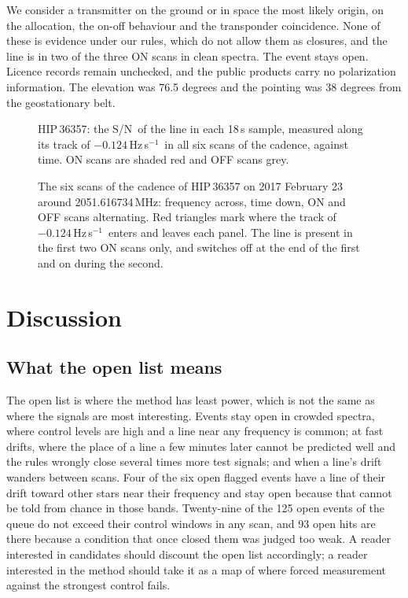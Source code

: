 \documentclass[twocolumn]{aastex631}
\newcommand{\hzs}{Hz\,s$^{-1}$}
\newcommand{\sn}{S/N}
\begin{document}
We consider a transmitter on the ground or in space the most likely origin,
on the allocation, the on-off behaviour and the transponder coincidence.
None of these is evidence under our rules, which do not allow them as
closures, and the line is in two of the three ON scans in clean spectra.
The event stays open. Licence records remain unchecked, and the public products carry
no polarization information. The elevation was 76.5 degrees and the pointing
was 38 degrees from the geostationary belt.

\begin{figure}
\caption{HIP\,36357: the \sn\ of the line in each 18\,s sample, measured
along its track of $-0.124$\,\hzs\ in all six scans of the cadence, against
time. ON scans are shaded red and OFF scans grey. \label{fig:lightcurve}}
\end{figure}

\begin{figure}
\caption{The six scans of the cadence of HIP\,36357 on 2017 February 23
around 2051.616734\,MHz: frequency across, time down, ON and OFF scans
alternating. Red triangles mark where the track of $-0.124$\,\hzs\ enters
and leaves each panel. The line is present in the first two ON scans only,
and switches off at the end of the first and on during the second.
\label{fig:hip36357}}
\end{figure}

\section{Discussion} \label{sec:discussion}

\subsection{What the open list means}

The open list is where the method has least power, which is not the same as
where the signals are most interesting. Events stay open in crowded
spectra, where control levels are high and a line near any frequency is
common; at fast drifts, where the place of a line a few minutes later
cannot be predicted well and the rules wrongly close several times more
test signals; and when a line's
drift wanders between scans. Four of the six open flagged events have a
line of their drift toward other stars near their frequency and stay open
because that cannot be told from chance in those bands. Twenty-nine of the
125 open events of the queue do not exceed their control windows in any
scan, and 93 open hits are there because a condition that once closed them
was judged too weak. A
reader interested in candidates should discount the open list accordingly;
a reader interested in the method should take it as a map of where forced
measurement against the strongest control fails.
\end{document}
